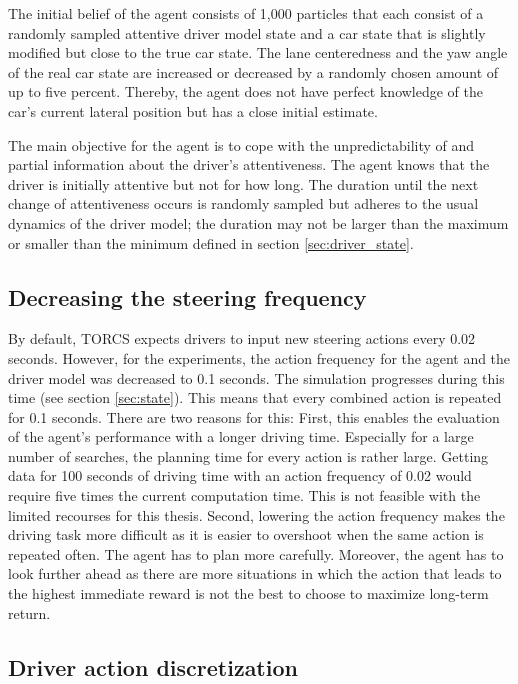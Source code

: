 The initial belief of the agent consists of 1,000 particles that each consist of a randomly sampled attentive driver model state and a car state that is slightly modified but close to the true car state. The lane centeredness and the yaw angle of the real car state are increased or decreased by a randomly chosen amount of up to five percent. Thereby, the agent does not have perfect knowledge of the car's current lateral position but has a close initial estimate.

The main objective for the agent is to cope with the unpredictability of and partial information about the driver's attentiveness. The agent knows that the driver is initially attentive but not for how long. The duration until the next change of attentiveness occurs is randomly sampled but adheres to the usual dynamics of the driver model; the duration may not be larger than the maximum or smaller than the minimum defined in section \ref{sec:driver_state}.

\subsection{Decreasing the steering frequency}

By default, TORCS expects drivers to input new steering actions every 0.02 seconds. However, for the experiments, the action frequency for the agent and the driver model was decreased to 0.1 seconds. The simulation progresses during this time (see section \ref{sec:state}). This means that every combined action is repeated for 0.1 seconds. There are two reasons for this: First, this enables the evaluation of the agent's performance with a longer driving time. Especially for a large number of searches, the planning time for every action is rather large. Getting data for 100 seconds of driving time with an action frequency of 0.02 would require five times the current computation time. This is not feasible with the limited recourses for this thesis. Second, lowering the action frequency makes the driving task more difficult as it is easier to overshoot when the same action is repeated often. The agent has to plan more carefully.  Moreover, the agent has to look further ahead as there are more situations in which the action that leads to the highest immediate reward is not the best to choose to maximize long-term return.

\subsection{Driver action discretization}

